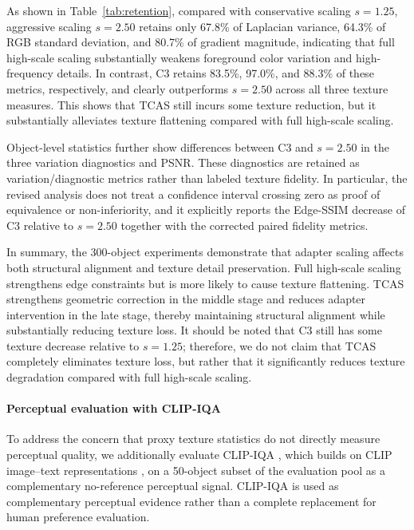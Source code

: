 \documentclass[times,twocolumn,final]{elsarticle}
\begin{document}
As shown in Table~\ref{tab:retention}, compared with conservative scaling $s = 1.25$, aggressive scaling $s = 2.50$ retains only 67.8\% of Laplacian variance, 64.3\% of RGB standard deviation, and 80.7\% of gradient magnitude, indicating that full high-scale scaling substantially weakens foreground color variation and high-frequency details. In contrast, C3 retains 83.5\%, 97.0\%, and 88.3\% of these metrics, respectively, and clearly outperforms $s = 2.50$ across all three texture measures. This shows that TCAS still incurs some texture reduction, but it substantially alleviates texture flattening compared with full high-scale scaling.

Object-level statistics further show differences between C3 and $s = 2.50$ in the three variation diagnostics and PSNR. These diagnostics are retained as variation/diagnostic metrics rather than labeled texture fidelity. In particular, the revised analysis does not treat a confidence interval crossing zero as proof of equivalence or non-inferiority, and it explicitly reports the Edge-SSIM decrease of C3 relative to $s = 2.50$ together with the corrected paired fidelity metrics.

In summary, the 300-object experiments demonstrate that adapter scaling affects both structural alignment and texture detail preservation. Full high-scale scaling strengthens edge constraints but is more likely to cause texture flattening. TCAS strengthens geometric correction in the middle stage and reduces adapter intervention in the late stage, thereby maintaining structural alignment while substantially reducing texture loss. It should be noted that C3 still has some texture decrease relative to $s = 1.25$; therefore, we do not claim that TCAS completely eliminates texture loss, but rather that it significantly reduces texture degradation compared with full high-scale scaling.

\paragraph{Perceptual evaluation with CLIP-IQA}
To address the concern that proxy texture statistics do not directly measure perceptual quality, we additionally evaluate CLIP-IQA \cite{wang2023clipiqa}, which builds on CLIP image--text representations \cite{radford2021clip}, on a 50-object subset of the evaluation pool as a complementary no-reference perceptual signal. CLIP-IQA is used as complementary perceptual evidence rather than a complete replacement for human preference evaluation.
\end{document}
